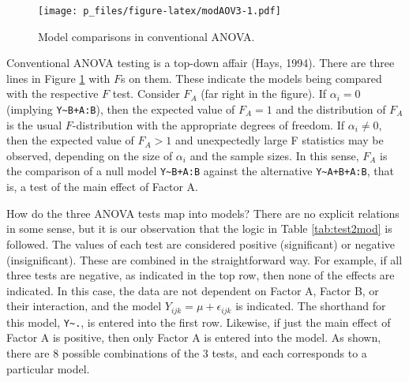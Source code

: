 \documentclass[
  english,
  ,man]{apa6}
\begin{document}
\begin{figure}
\centering
\texttt{[image: p\_files/figure-latex/modAOV3-1.pdf]}
\caption{\label{fig:modAOV3}Model comparisons in conventional ANOVA.}
\end{figure}

Conventional ANOVA testing is a top-down affair (Hays, 1994). There are three lines in Figure \ref{fig:modAOV3} with \(F\)s on them. These indicate the models being compared with the respective \(F\) test. Consider \(F_A\) (far right in the figure). If \(\alpha_i=0\) (implying \texttt{Y\textasciitilde{}B+A:B}), then the expected value of \(F_A=1\) and the distribution of \(F_A\) is the usual \(F\)-distribution with the appropriate degrees of freedom. If \(\alpha_i \neq 0\), then the expected value of \(F_A>1\) and unexpectedly large F statistics may be observed, depending on the size of \(\alpha_i\) and the sample sizes. In this sense, \(F_A\) is the comparison of a null model \texttt{Y\textasciitilde{}B+A:B} against the alternative \texttt{Y\textasciitilde{}A+B+A:B}, that is, a test of the main effect of Factor A.

How do the three ANOVA tests map into models? There are no explicit relations in some sense, but it is our observation that the logic in Table \ref{tab:test2mod} is followed. The values of each test are considered positive (significant) or negative (insignificant). These are combined in the straightforward way. For example, if all three tests are negative, as indicated in the top row, then none of the effects are indicated. In this case, the data are not dependent on Factor A, Factor B, or their interaction, and the model \(Y_{ijk} = \mu +\epsilon_{ijk}\) is indicated. The shorthand for this model, \texttt{Y\textasciitilde{}.}, is entered into the first row. Likewise, if just the main effect of Factor A is positive, then only Factor A is entered into the model. As shown, there are 8 possible combinations of the 3 tests, and each corresponds to a particular model.
\end{document}
